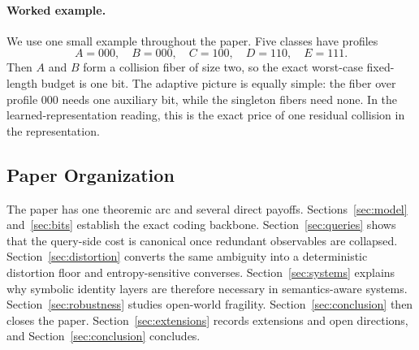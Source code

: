 \paragraph{Worked example.}

We use one small example throughout the paper. Five classes have profiles
\[
A=000,\quad B=000,\quad C=100,\quad D=110,\quad E=111.
\]
Then $A$ and $B$ form a collision fiber of size two, so the exact worst-case fixed-length budget is one bit. The adaptive picture is equally simple: the fiber over profile $000$ needs one auxiliary bit, while the singleton fibers need none. In the learned-representation reading, this is the exact price of one residual collision in the representation.

\subsection{Paper Organization}

The paper has one theoremic arc and several direct payoffs. Sections~\ref{sec:model} and~\ref{sec:bits} establish the exact coding backbone. Section~\ref{sec:queries} shows that the query-side cost is canonical once redundant observables are collapsed. Section~\ref{sec:distortion} converts the same ambiguity into a deterministic distortion floor and entropy-sensitive converses. Section~\ref{sec:systems} explains why symbolic identity layers are therefore necessary in semantics-aware systems. Section~\ref{sec:robustness} studies open-world fragility. \ifdefined\JSAITREVIEW Section~\ref{sec:conclusion} then closes the paper. \else Section~\ref{sec:extensions} records extensions and open directions, and Section~\ref{sec:conclusion} concludes. \fi
